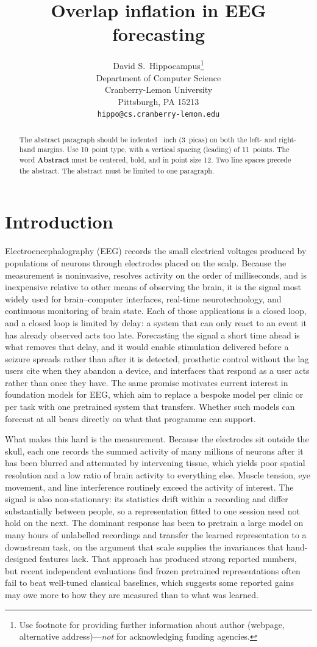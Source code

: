 \documentclass{article}
\title{Overlap inflation in EEG forecasting}
\author{%
  David S.~Hippocampus\thanks{Use footnote for providing further information
    about author (webpage, alternative address)---\emph{not} for acknowledging
    funding agencies.} \\
  Department of Computer Science\\
  Cranberry-Lemon University\\
  Pittsburgh, PA 15213 \\
  \texttt{hippo@cs.cranberry-lemon.edu} \\
}
\begin{document}
\maketitle

\begin{abstract}
  The abstract paragraph should be indented ~inch (3~picas) on both the left- and right-hand margins. Use 10~point type, with a vertical spacing (leading) of 11~points. The word \textbf{Abstract} must be centered, bold, and in point size 12. Two line spaces precede the abstract. The abstract must be limited to one paragraph.
\end{abstract}


\section{Introduction}

Electroencephalography (EEG) records the small electrical voltages produced
by populations of neurons through electrodes placed on the scalp. Because the
measurement is noninvasive, resolves activity on the order of milliseconds,
and is inexpensive relative to other means of observing the brain, it is the
signal most widely used for brain--computer interfaces, real-time
neurotechnology, and continuous monitoring of brain state. Each of those
applications is a closed loop, and a closed loop is limited by delay: a
system that can only react to an event it has already observed acts too late.
Forecasting the signal a short time ahead is what removes that delay, and it
would enable stimulation delivered before a seizure spreads rather than after
it is detected, prosthetic control without the lag users cite when they
abandon a device, and interfaces that respond as a user acts rather than once
they have. The same promise motivates current interest in foundation models
for EEG, which aim to replace a bespoke model per clinic or per task with one
pretrained system that transfers. Whether such models can forecast at all
bears directly on what that programme can support.

What makes this hard is the measurement. Because the electrodes sit outside
the skull, each one records the summed activity of many millions of neurons
after it has been blurred and attenuated by intervening tissue, which yields
poor spatial resolution and a low ratio of brain activity to everything else.
Muscle tension, eye movement, and line interference routinely exceed the
activity of interest. The signal is also non-stationary: its statistics drift
within a recording and differ substantially between people, so a
representation fitted to one session need not hold on the next. The dominant
response has been to pretrain a large model on many hours of unlabelled
recordings and transfer the learned representation to a downstream task, on
the argument that scale supplies the invariances that hand-designed features
lack. That approach has produced strong reported numbers, but recent
independent evaluations find frozen pretrained representations often fail to
beat well-tuned classical baselines, which suggests some reported gains may
owe more to how they are measured than to what was learned.
\end{document}
